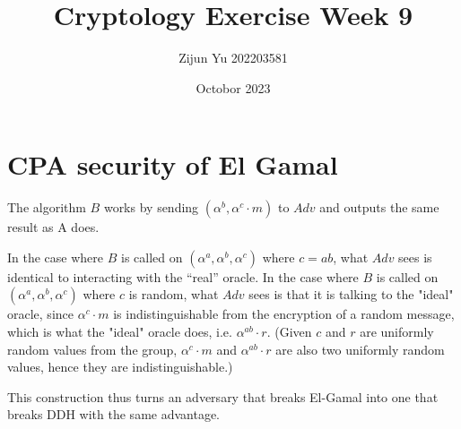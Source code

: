 \documentclass{article}
\title{Cryptology Exercise Week 9}
\author{Zijun Yu 202203581}
\date{Octobor 2023}
\begin{document}
\maketitle

\section*{CPA security of El Gamal}

The algorithm $B$ works by sending $(\alpha^b, \alpha^c \cdot m)$ to $Adv$ and outputs
the same result as A does.

In the case where $B$ is called on $(\alpha^a, \alpha^b, \alpha^c)$ where $c = ab$,
what $Adv$ sees is identical to interacting with the “real” oracle. In the case where $B$
is called on $(\alpha^a, \alpha^b, \alpha^c)$ where $c$ is random, what $Adv$ sees
is that it is talking to the "ideal" oracle, since $\alpha^c \cdot m$ is indistinguishable
from the encryption of a random message, which is what the "ideal" oracle does,
i.e. $\alpha^{ab} \cdot r$. (Given $c$ and $r$ are uniformly random values
from the group, $\alpha^c \cdot m$ and $\alpha^{ab} \cdot r$ are also two uniformly random values,
hence they are indistinguishable.)

This construction thus turns an adversary that breaks El-Gamal into one that breaks DDH with the same
advantage.
\end{document}
